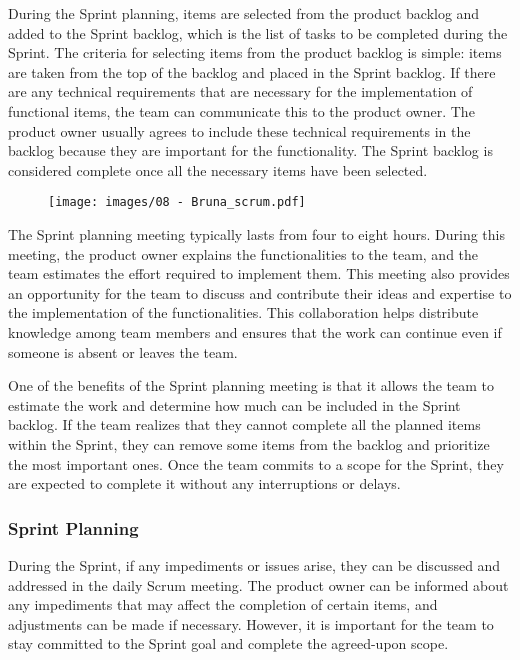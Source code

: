During the Sprint planning, items are selected from the product backlog
and added to the Sprint backlog, which is the list of tasks to be
completed during the Sprint. The criteria for selecting items from the
product backlog is simple: items are taken from the top of the backlog
and placed in the Sprint backlog. If there are any technical
requirements that are necessary for the implementation of functional
items, the team can communicate this to the product owner. The product
owner usually agrees to include these technical requirements in the
backlog because they are important for the functionality. The Sprint
backlog is considered complete once all the necessary items have been
selected.

\begin{figure}[!h]
    \centering
    \texttt{[image: images/08 - Bruna\_scrum.pdf]}
\end{figure}

The Sprint planning meeting typically lasts from four to eight hours.
During this meeting, the product owner explains the functionalities to
the team, and the team estimates the effort required to implement them.
This meeting also provides an opportunity for the team to discuss and
contribute their ideas and expertise to the implementation of the
functionalities. This collaboration helps distribute knowledge among
team members and ensures that the work can continue even if someone is
absent or leaves the team.

One of the benefits of the Sprint planning meeting is that it allows the
team to estimate the work and determine how much can be included in the
Sprint backlog. If the team realizes that they cannot complete all the
planned items within the Sprint, they can remove some items from the
backlog and prioritize the most important ones. Once the team commits to
a scope for the Sprint, they are expected to complete it without any
interruptions or delays.

\subsubsection{Sprint Planning}

During the Sprint, if any impediments or issues arise, they can be
discussed and addressed in the daily Scrum meeting. The product owner
can be informed about any impediments that may affect the completion of
certain items, and adjustments can be made if necessary. However, it is
important for the team to stay committed to the Sprint goal and complete
the agreed-upon scope.

